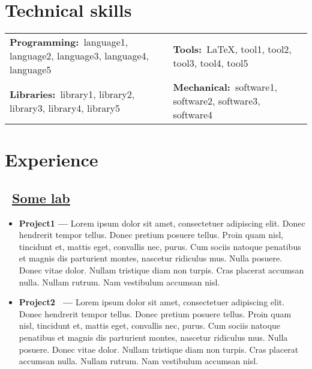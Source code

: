 \documentclass{article}
\begin{document}
\section{Technical skills}
	\begin{flushleft}
	\begin{table}[!h]
	\begin{tabularx}{\linewidth}{lX}
		\textbf{Programming:}\
		language1,
		language2,
		language3,
		language4,
		language5
		&
		\textbf{Tools:}\
		{\LaTeX},
		tool1,
		tool2,
		tool3,
		tool4,
		tool5
		\\

		\textbf{Libraries:}\
		library1,
		library2,
		library3,
		library4,
		library5
		&
		\textbf{Mechanical:}\
		software1,
		software2,
		software3,
		software4
	\end{tabularx}
	\end{table}
	\end{flushleft}

\vspace{-\baselineskip}
\vspace{-0.25em}

\section{Experience}
  \subsection{\faUniversity~\href{https://www.example.com}{\underline{Some lab}}}
	\begin{itemize}
		\item \textbf{Project1 --- }
		Lorem ipsum dolor sit amet, consectetuer adipiscing elit.  Donec hendrerit tempor tellus.  Donec pretium posuere tellus.  Proin quam nisl, tincidunt et, mattis eget, convallis nec, purus.  Cum sociis natoque penatibus et magnis dis parturient montes, nascetur ridiculus mus.  Nulla posuere.  Donec vitae dolor.  Nullam tristique diam non turpis.  Cras placerat accumsan nulla.  Nullam rutrum.  Nam vestibulum accumsan nisl.

		\item \textbf{Project2~\href{https://github.com/username/repo}{\underline{\faGithub}} --- }
		Lorem ipsum dolor sit amet, consectetuer adipiscing elit.  Donec hendrerit tempor tellus.  Donec pretium posuere tellus.  Proin quam nisl, tincidunt et, mattis eget, convallis nec, purus.  Cum sociis natoque penatibus et magnis dis parturient montes, nascetur ridiculus mus.  Nulla posuere.  Donec vitae dolor.  Nullam tristique diam non turpis.  Cras placerat accumsan nulla.  Nullam rutrum.  Nam vestibulum accumsan nisl.
	\end{itemize}
\end{document}
